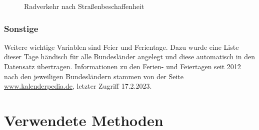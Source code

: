 \documentclass[a4paper,12pt]{thesis}
\begin{document}
\begin{figure}[!ht]%
	\centering
	\qquad
	\caption{Radverkehr nach Straßenbeschaffenheit}
	\label{VerkehrnachTypen}%
\end{figure}

\subsection{Sonstige}

Weitere wichtige Variablen sind Feier und Ferientage. Dazu wurde eine Liste dieser Tage händisch für alle Bundesländer angelegt und diese automatisch in den Datensatz übertragen. Informationen zu den Ferien- und Feiertagen seit 2012 nach den jeweiligen Bundesländern stammen von der Seite \url{www.kalenderpedia.de}, letzter Zugriff 17.2.2023.

\chapter{Verwendete Methoden}
\end{document}
